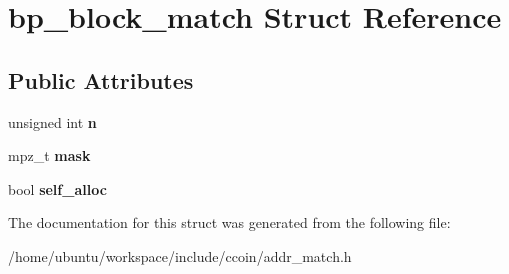 \hypertarget{structbp__block__match}{\section{bp\-\_\-block\-\_\-match Struct Reference}
\label{structbp__block__match}
}
\subsection*{Public Attributes}
\begin{DoxyCompactItemize}
\item 
\hypertarget{structbp__block__match_a27b90cb70876e3ac2ffb6d61c8e73388}{unsigned int {\bfseries n}}\label{structbp__block__match_a27b90cb70876e3ac2ffb6d61c8e73388}

\item 
\hypertarget{structbp__block__match_a62c11c9fa5cba0d78c6d5f904b3e786a}{mpz\-\_\-t {\bfseries mask}}\label{structbp__block__match_a62c11c9fa5cba0d78c6d5f904b3e786a}

\item 
\hypertarget{structbp__block__match_a05d2edeb2e2692fa0cef90b89edc1616}{bool {\bfseries self\-\_\-alloc}}\label{structbp__block__match_a05d2edeb2e2692fa0cef90b89edc1616}

\end{DoxyCompactItemize}


The documentation for this struct was generated from the following file\-:\begin{DoxyCompactItemize}
\item 
/home/ubuntu/workspace/include/ccoin/addr\-\_\-match.\-h\end{DoxyCompactItemize}
